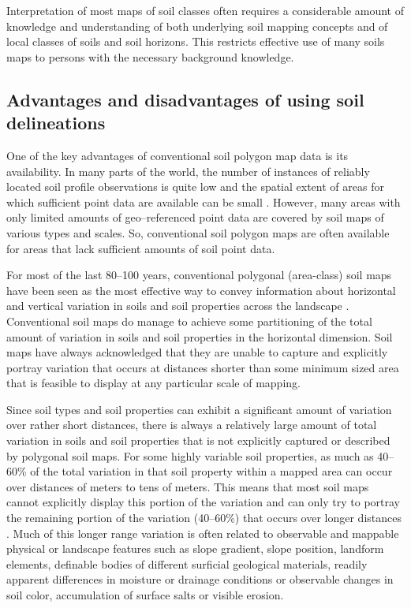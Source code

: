 \documentclass[graybox,natbib,nospthms,UStrade]{svmono}
\begin{document}
Interpretation of most maps of soil classes often requires a
considerable amount of knowledge and understanding of both underlying
soil mapping concepts and of local classes of soils and soil horizons.
This restricts effective use of many soils maps to persons with the
necessary background knowledge.

\hypertarget{advantages-and-disadvantages-of-using-soil-delineations}{%
\subsection{Advantages and disadvantages of using soil delineations}\label{advantages-and-disadvantages-of-using-soil-delineations}}

One of the key advantages of conventional soil polygon map data is its
availability. In many parts of the world, the number of instances of
reliably located soil profile observations is quite low and the spatial
extent of areas for which sufficient point data are available can be
small \citep{Hartemink2008SMD}. However, many areas with only limited amounts
of geo--referenced point data are covered by soil maps of various types
and scales. So, conventional soil polygon maps are often available for
areas that lack sufficient amounts of soil point data.

For most of the last 80--100 years, conventional polygonal (area-class)
soil maps have been seen as the most effective way to convey information
about horizontal and vertical variation in soils and soil properties
across the landscape \citep{Wysocki2005Geoderma}. Conventional soil maps do
manage to achieve some partitioning of the total amount of variation in
soils and soil properties in the horizontal dimension. Soil maps have
always acknowledged that they are unable to capture and explicitly
portray variation that occurs at distances shorter than some minimum
sized area that is feasible to display at any particular scale of
mapping.

Since soil types and soil properties can exhibit a significant amount of
variation over rather short distances, there is always a relatively
large amount of total variation in soils and soil properties that is not
explicitly captured or described by polygonal soil maps. For some highly
variable soil properties, as much as 40--60\% of the total variation in that
soil property within a mapped area can occur over distances of meters to
tens of meters. This means that most soil maps cannot explicitly display
this portion of the variation and can only try to portray the remaining
portion of the variation (40--60\%) that occurs over longer distances
\citep{Heuvelink2001Geoderma}. Much of this longer range variation is often
related to observable and mappable physical or landscape features such
as slope gradient, slope position, landform elements, definable bodies
of different surficial geological materials, readily apparent
differences in moisture or drainage conditions or observable changes in
soil color, accumulation of surface salts or visible erosion.
\end{document}
